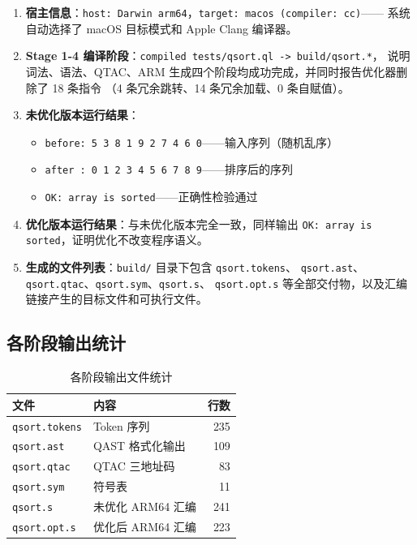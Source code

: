 \documentclass[12pt,a4paper]{ctexart}
\begin{document}
\begin{enumerate}
  \item \textbf{宿主信息}：\texttt{host: Darwin arm64}，\texttt{target: macos (compiler: cc)}——
        系统自动选择了 macOS 目标模式和 Apple Clang 编译器。

  \item \textbf{Stage 1-4 编译阶段}：\texttt{compiled tests/qsort.ql -> build/qsort.*}，
        说明词法、语法、QTAC、ARM 生成四个阶段均成功完成，并同时报告优化器删除了 18 条指令
        （4 条冗余跳转、14 条冗余加载、0 条自赋值）。

  \item \textbf{未优化版本运行结果}：
        \begin{itemize}
          \item \texttt{before: 5 3 8 1 9 2 7 4 6 0}——输入序列（随机乱序）
          \item \texttt{after : 0 1 2 3 4 5 6 7 8 9}——排序后的序列
          \item \texttt{OK: array is sorted}——正确性检验通过
        \end{itemize}

  \item \textbf{优化版本运行结果}：与未优化版本完全一致，同样输出
        \texttt{OK: array is sorted}，证明优化不改变程序语义。

  \item \textbf{生成的文件列表}：\texttt{build/} 目录下包含 \texttt{qsort.tokens}、
        \texttt{qsort.ast}、\texttt{qsort.qtac}、\texttt{qsort.sym}、\texttt{qsort.s}、
        \texttt{qsort.opt.s} 等全部交付物，以及汇编链接产生的目标文件和可执行文件。
\end{enumerate}

\subsection{各阶段输出统计}

\begin{table}[H]
\centering
\caption{各阶段输出文件统计}
\label{tab:outputs}
\begin{tabular}{llr}
\toprule
文件 & 内容 & 行数 \\
\midrule
\texttt{qsort.tokens} & Token 序列 & 235 \\
\texttt{qsort.ast}    & QAST 格式化输出 & 109 \\
\texttt{qsort.qtac}   & QTAC 三地址码 & 83 \\
\texttt{qsort.sym}    & 符号表 & 11 \\
\texttt{qsort.s}      & 未优化 ARM64 汇编 & 241 \\
\texttt{qsort.opt.s}  & 优化后 ARM64 汇编 & 223 \\
\bottomrule
\end{tabular}
\end{table}
\end{document}
